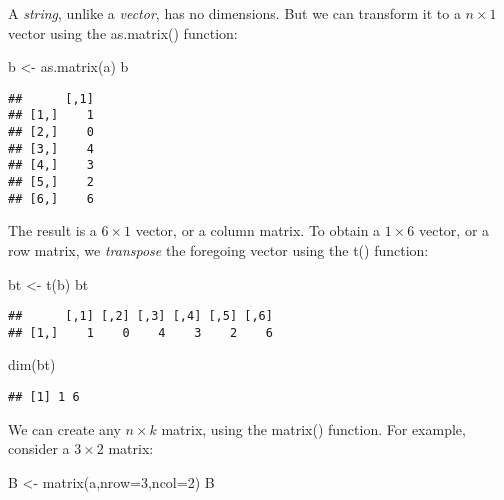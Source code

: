\documentclass[
  oneside]{book}
\newenvironment{Shaded}{\begin{snugshade}}{\end{snugshade}}
\newcommand{\AttributeTok}[1]{\textcolor[rgb]{0.77,0.63,0.00}{#1}}
\newcommand{\DecValTok}[1]{\textcolor[rgb]{0.00,0.00,0.81}{#1}}
\newcommand{\FunctionTok}[1]{\textcolor[rgb]{0.00,0.00,0.00}{#1}}
\newcommand{\NormalTok}[1]{#1}
\newcommand{\OtherTok}[1]{\textcolor[rgb]{0.56,0.35,0.01}{#1}}
\begin{document}
A \emph{string}, unlike a \emph{vector}, has no dimensions. But we can transform it to a \(n \times 1\) vector using the as.matrix() function:

\begin{Shaded}
\begin{Highlighting}[]
\NormalTok{b }\OtherTok{\textless{}{-}} \FunctionTok{as.matrix}\NormalTok{(a)}
\NormalTok{b}
\end{Highlighting}
\end{Shaded}

\begin{verbatim}
##      [,1]
## [1,]    1
## [2,]    0
## [3,]    4
## [4,]    3
## [5,]    2
## [6,]    6
\end{verbatim}

The result is a \(6 \times 1\) vector, or a column matrix. To obtain a \(1 \times 6\) vector, or a row matrix, we \emph{transpose} the foregoing vector using the t() function:

\begin{Shaded}
\begin{Highlighting}[]
\NormalTok{bt }\OtherTok{\textless{}{-}} \FunctionTok{t}\NormalTok{(b)}
\NormalTok{bt}
\end{Highlighting}
\end{Shaded}

\begin{verbatim}
##      [,1] [,2] [,3] [,4] [,5] [,6]
## [1,]    1    0    4    3    2    6
\end{verbatim}

\begin{Shaded}
\begin{Highlighting}[]
\FunctionTok{dim}\NormalTok{(bt)}
\end{Highlighting}
\end{Shaded}

\begin{verbatim}
## [1] 1 6
\end{verbatim}

We can create any \(n \times k\) matrix, using the matrix() function. For example, consider a \(3 \times 2\) matrix:

\begin{Shaded}
\begin{Highlighting}[]
\NormalTok{B }\OtherTok{\textless{}{-}} \FunctionTok{matrix}\NormalTok{(a,}\AttributeTok{nrow=}\DecValTok{3}\NormalTok{,}\AttributeTok{ncol=}\DecValTok{2}\NormalTok{)}
\NormalTok{B}
\end{Highlighting}
\end{Shaded}
\end{document}
